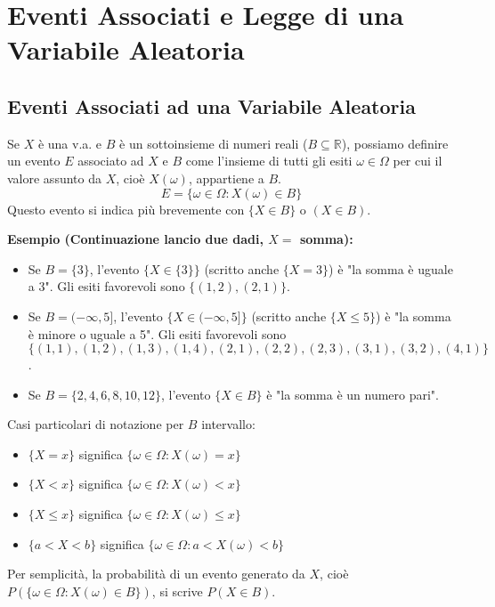 \section{Eventi Associati e Legge di una Variabile Aleatoria}

\subsection{Eventi Associati ad una Variabile Aleatoria}
Se $X$ è una v.a. e $B$ è un sottoinsieme di numeri reali ($B \subseteq \mathbb{R}$), possiamo definire un evento $E$ associato ad $X$ e $B$ come l'insieme di tutti gli esiti $\omega \in \Omega$ per cui il valore assunto da $X$, cioè $X(\omega)$, appartiene a $B$.
\[ E = \{\omega \in \Omega : X(\omega) \in B\} \]
Questo evento si indica più brevemente con $\{X \in B\}$ o $(X \in B)$.

\begin{example}
\textbf{Esempio (Continuazione lancio due dadi, $X=$ somma):}
\begin{itemize}
    \item Se $B = \{3\}$, l'evento $\{X \in \{3\}\}$ (scritto anche $\{X=3\}$) è "la somma è uguale a 3".
    Gli esiti favorevoli sono $\{(1,2), (2,1)\}$.
    \item Se $B = (-\infty, 5]$, l'evento $\{X \in (-\infty, 5]\}$ (scritto anche $\{X \le 5\}$) è "la somma è minore o uguale a 5".
    Gli esiti favorevoli sono $\{(1,1), (1,2), (1,3), (1,4), (2,1), (2,2), (2,3), (3,1), (3,2), (4,1)\}$.
    \item Se $B = \{2, 4, 6, 8, 10, 12\}$, l'evento $\{X \in B\}$ è "la somma è un numero pari".
\end{itemize}
\end{example}

Casi particolari di notazione per $B$ intervallo:
\begin{itemize}
    \item $\{X = x\}$ significa $\{\omega \in \Omega : X(\omega) = x\}$
    \item $\{X < x\}$ significa $\{\omega \in \Omega : X(\omega) < x\}$
    \item $\{X \le x\}$ significa $\{\omega \in \Omega : X(\omega) \le x\}$
    \item $\{a < X < b\}$ significa $\{\omega \in \Omega : a < X(\omega) < b\}$
\end{itemize}
Per semplicità, la probabilità di un evento generato da $X$, cioè $P(\{\omega \in \Omega: X(\omega) \in B\})$, si scrive $P(X \in B)$.

